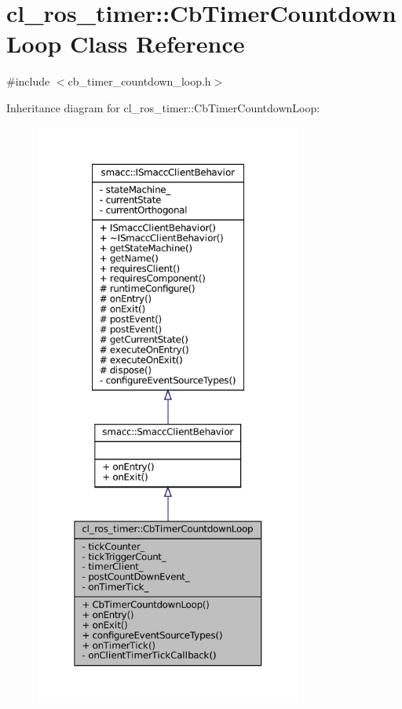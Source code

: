 \hypertarget{classcl__ros__timer_1_1CbTimerCountdownLoop}{}\section{cl\+\_\+ros\+\_\+timer\+:\+:Cb\+Timer\+Countdown\+Loop Class Reference}
\label{classcl__ros__timer_1_1CbTimerCountdownLoop}


{\ttfamily \#include $<$cb\+\_\+timer\+\_\+countdown\+\_\+loop.\+h$>$}



Inheritance diagram for cl\+\_\+ros\+\_\+timer\+:\+:Cb\+Timer\+Countdown\+Loop\+:
\nopagebreak
\begin{figure}[H]
\begin{center}
\leavevmode
\includegraphics[height=550pt]{classcl__ros__timer_1_1CbTimerCountdownLoop__inherit__graph}
\end{center}
\end{figure}


